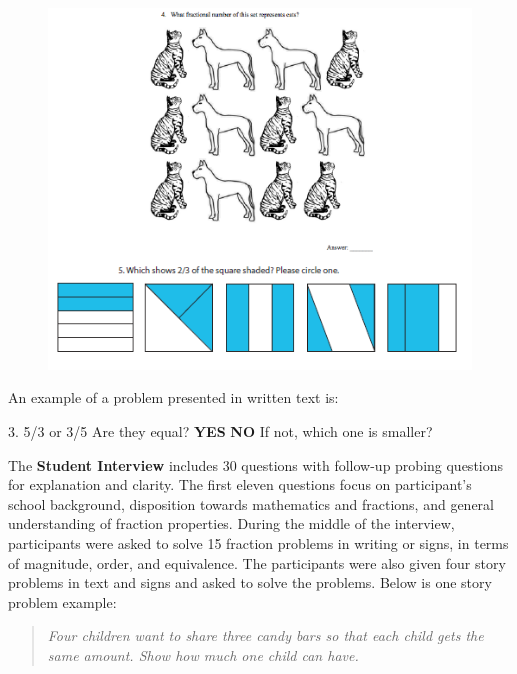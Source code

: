 \documentclass[11.5pt]{sig-alternate} %
\begin{document}
\begin{large}
\begin{figure}[h]
     \centering
     \includegraphics[width=1\linewidth]{figure1.png}
     \caption{}
 \end{figure}

An example of a problem presented in written text is:

3. 5/3 or 3/5 \hspace{0.5em} Are they equal? \hspace{0.5em} \textbf{YES} \hspace{0.5em} \textbf{NO} \hspace{0.5em} If not, which one is smaller?


The \textbf{Student Interview} includes 30 questions with follow-up probing questions for explanation and clarity. The first eleven questions focus on participant’s school background, disposition towards mathematics and fractions, and general understanding of fraction properties. During the middle of the interview, participants were asked to solve 15 fraction problems in writing or signs, in terms of magnitude, order, and equivalence. The participants were also given four story problems in text and signs and asked to solve the problems. Below is one story problem example:

\begin{quote}
\textit{Four children want to share three candy bars so that each child gets the same amount. Show how much one child can have.}
\end{quote}


\end{large}
\end{document}
